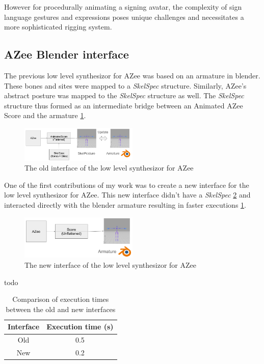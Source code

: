 \documentclass[../../main.tex]{subfiles}
\begin{document}
However for procedurally animating a signing avatar, the complexity of sign language gestures and expressions poses unique challenges and necessitates a more sophisticated rigging system.

\subsection{AZee Blender interface}
\label{subsec:azee_blender_interface}

The previous low level synthesizor for AZee \cite{fabrizio} was based on an armature in blender. These bones and sites were mapped to a \emph{SkelSpec} structure. Similarly, AZee's abstract posture was mapped to the \emph{SkelSpec} structure as well. The \emph{SkelSpec} structure thus formed as an intermediate bridge between an Animated AZee Score and the armature \ref{fig:old_interface}. 

\begin{figure}[h]
    \centering
    \includegraphics[width=0.5\textwidth]{chapters/rigging_layers/images/old_interface.png}
    \caption{The old interface of the low level synthesizor for AZee}
    \label{fig:old_interface}
\end{figure}

One of the first contributions of my work was to create a new interface for the low level synthesizor for AZee. This new interface didn't have a \emph{SkelSpec} \ref{fig:new_interface} and interacted directly with the blender armature resulting in faster executions \ref{tab:faster_executions}.

\begin{figure}[h]
    \centering
    \includegraphics[width=0.5\textwidth]{chapters/rigging_layers/images/new_interface.png}
    \caption{The new interface of the low level synthesizor for AZee}
    \label{fig:new_interface}
\end{figure}

todo
\begin{table}
    \centering
    \begin{tabular}{|c|c|}
        \hline
        \textbf{Interface} & \textbf{Execution time (s)} \\
        \hline
        Old & 0.5 \\
        New & 0.2 \\
        \hline
    \end{tabular}
    \caption{Comparison of execution times between the old and new interfaces}
    \label{tab:faster_executions}
\end{table}
\end{document}
